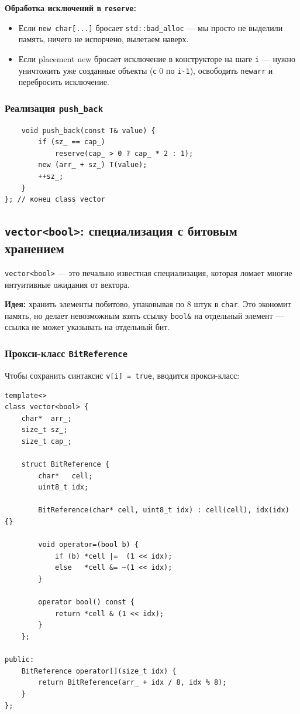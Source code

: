 \documentclass[a4paper,12pt]{article}
\begin{document}
\textbf{Обработка исключений в \texttt{reserve}:}
\begin{itemize}
    \item Если \texttt{new char[...]} бросает \texttt{std::bad\_alloc}
          --- мы просто не выделили память, ничего не испорчено, вылетаем наверх.
    \item Если placement new бросает исключение в конструкторе на шаге \texttt{i}
          --- нужно уничтожить уже созданные объекты (с 0 по \texttt{i-1}),
          освободить \texttt{newarr} и перебросить исключение.
\end{itemize}

\subsubsection{Реализация \texttt{push\_back}}

\begin{lstlisting}
    void push_back(const T& value) {
        if (sz_ == cap_)
            reserve(cap_ > 0 ? cap_ * 2 : 1);
        new (arr_ + sz_) T(value);
        ++sz_;
    }
}; // конец class vector
\end{lstlisting}

\subsection{\texttt{vector<bool>}: специализация с битовым хранением}

\texttt{vector<bool>} --- это печально известная специализация,
которая ломает многие интуитивные ожидания от вектора.

\textbf{Идея:} хранить элементы побитово, упаковывая по 8 штук в \texttt{char}.
Это экономит память, но делает невозможным взять ссылку \texttt{bool\&} на
отдельный элемент --- ссылка не может указывать на отдельный бит.

\subsubsection{Прокси-класс \texttt{BitReference}}

Чтобы сохранить синтаксис \texttt{v[i] = true}, вводится прокси-класс:

\begin{lstlisting}
template<>
class vector<bool> {
    char*  arr_;
    size_t sz_;
    size_t cap_;

    struct BitReference {
        char*   cell;
        uint8_t idx;

        BitReference(char* cell, uint8_t idx) : cell(cell), idx(idx) {}

        void operator=(bool b) {
            if (b) *cell |=  (1 << idx);
            else   *cell &= ~(1 << idx);
        }

        operator bool() const {
            return *cell & (1 << idx);
        }
    };

public:
    BitReference operator[](size_t idx) {
        return BitReference(arr_ + idx / 8, idx % 8);
    }
};
\end{lstlisting}
\end{document}
